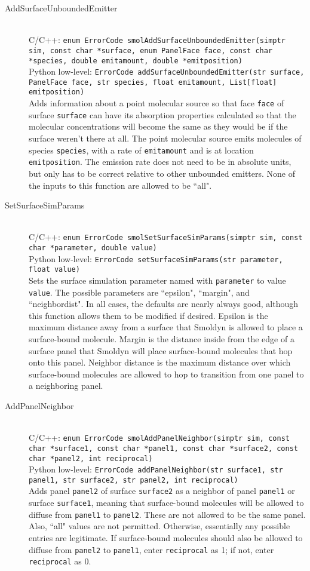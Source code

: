 \documentclass {book}
\newcommand {\ttt} {\texttt}
\begin{document}
\begin{description}
\item[AddSurfaceUnboundedEmitter]
\hfill \\
C/C++: \ttt{enum ErrorCode smolAddSurfaceUnboundedEmitter(simptr sim, const char *surface, enum PanelFace face, const char *species, double emitamount, double *emitposition)}\\
Python low-level: \ttt{ErrorCode addSurfaceUnboundedEmitter(str surface, PanelFace face, str species, float emitamount, List[float] emitposition)}\\
Adds information about a point molecular source so that face \ttt{face} of surface \ttt{surface} can have its absorption properties calculated so that the molecular concentrations will become the same as they would be if the surface weren't there at all. The point molecular source emits molecules of species \ttt{species}, with a rate of \ttt{emitamount} and is at location \ttt{emitposition}. The emission rate does not need to be in absolute units, but only has to be correct relative to other unbounded emitters. None of the inputs to this function are allowed to be ``all".

\item[SetSurfaceSimParams]
\hfill \\
C/C++: \ttt{enum ErrorCode smolSetSurfaceSimParams(simptr sim, const char *parameter, double value)}\\
Python low-level: \ttt{ErrorCode setSurfaceSimParams(str parameter, float value)}\\
Sets the surface simulation parameter named with \ttt{parameter} to value \ttt{value}. The possible parameters are ``epsilon", ``margin", and ``neighbordist". In all cases, the defaults are nearly always good, although this function allows them to be modified if desired. Epsilon is the maximum distance away from a surface that Smoldyn is allowed to place a surface-bound molecule. Margin is the distance inside from the edge of a surface panel that Smoldyn will place surface-bound molecules that hop onto this panel. Neighbor distance is the maximum distance over which surface-bound molecules are allowed to hop to transition from one panel to a neighboring panel.

\item[AddPanelNeighbor]
\hfill \\
C/C++: \ttt{enum ErrorCode smolAddPanelNeighbor(simptr sim, const char *surface1, const char *panel1, const char *surface2, const char *panel2, int reciprocal)}\\
Python low-level: \ttt{ErrorCode addPanelNeighbor(str surface1, str panel1, str surface2, str panel2, int reciprocal)}\\
Adds panel \ttt{panel2} of surface \ttt{surface2} as a neighbor of panel \ttt{panel1} or surface \ttt{surface1}, meaning that surface-bound molecules will be allowed to diffuse from \ttt{panel1} to \ttt{panel2}. These are not allowed to be the same panel. Also, ``all" values are not permitted. Otherwise, essentially any possible entries are legitimate. If surface-bound molecules should also be allowed to diffuse from \ttt{panel2} to \ttt{panel1}, enter \ttt{reciprocal} as 1; if not, enter \ttt{reciprocal} as 0.


\end{description}
\end{document}
